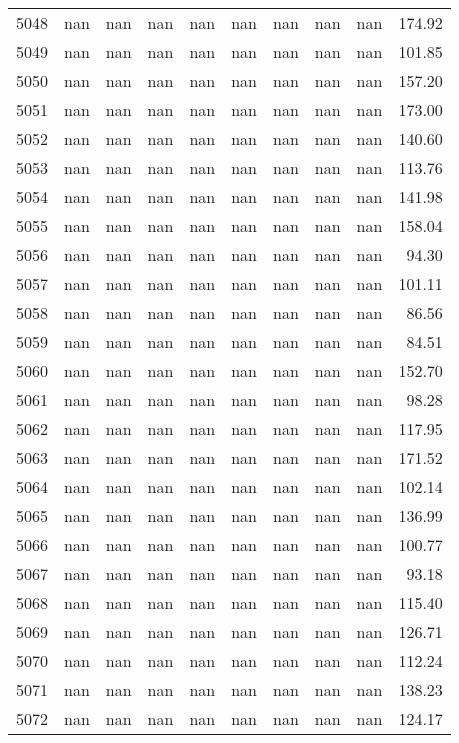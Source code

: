\begin{tabular}{lrrrrrrrrr}
5048 & nan & nan & nan & nan & nan & nan & nan & nan & 174.92 \\
5049 & nan & nan & nan & nan & nan & nan & nan & nan & 101.85 \\
5050 & nan & nan & nan & nan & nan & nan & nan & nan & 157.20 \\
5051 & nan & nan & nan & nan & nan & nan & nan & nan & 173.00 \\
5052 & nan & nan & nan & nan & nan & nan & nan & nan & 140.60 \\
5053 & nan & nan & nan & nan & nan & nan & nan & nan & 113.76 \\
5054 & nan & nan & nan & nan & nan & nan & nan & nan & 141.98 \\
5055 & nan & nan & nan & nan & nan & nan & nan & nan & 158.04 \\
5056 & nan & nan & nan & nan & nan & nan & nan & nan & 94.30 \\
5057 & nan & nan & nan & nan & nan & nan & nan & nan & 101.11 \\
5058 & nan & nan & nan & nan & nan & nan & nan & nan & 86.56 \\
5059 & nan & nan & nan & nan & nan & nan & nan & nan & 84.51 \\
5060 & nan & nan & nan & nan & nan & nan & nan & nan & 152.70 \\
5061 & nan & nan & nan & nan & nan & nan & nan & nan & 98.28 \\
5062 & nan & nan & nan & nan & nan & nan & nan & nan & 117.95 \\
5063 & nan & nan & nan & nan & nan & nan & nan & nan & 171.52 \\
5064 & nan & nan & nan & nan & nan & nan & nan & nan & 102.14 \\
5065 & nan & nan & nan & nan & nan & nan & nan & nan & 136.99 \\
5066 & nan & nan & nan & nan & nan & nan & nan & nan & 100.77 \\
5067 & nan & nan & nan & nan & nan & nan & nan & nan & 93.18 \\
5068 & nan & nan & nan & nan & nan & nan & nan & nan & 115.40 \\
5069 & nan & nan & nan & nan & nan & nan & nan & nan & 126.71 \\
5070 & nan & nan & nan & nan & nan & nan & nan & nan & 112.24 \\
5071 & nan & nan & nan & nan & nan & nan & nan & nan & 138.23 \\
5072 & nan & nan & nan & nan & nan & nan & nan & nan & 124.17 \\

\end{tabular}

